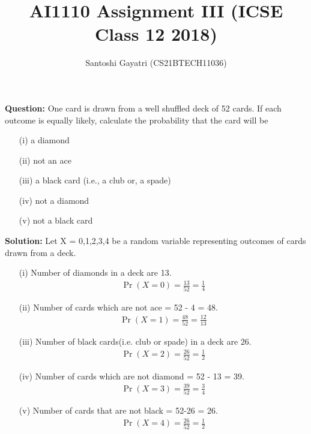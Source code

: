 \documentclass[journal,12pt,twocolumn]{IEEEtran}
\title{AI1110 Assignment III (ICSE Class 12 2018)}
\author{Santoshi Gayatri (CS21BTECH11036)}
\providecommand{\pr}[1]{\ensuremath{\Pr\left(#1\right)}}
\begin{document}
\maketitle

\textbf{Question:} One card is drawn from a well shuffled deck of 52 cards. If each outcome is equally likely, calculate the probability that the card will be
\begin{enumerate}
    \item[(i)]  a diamond
    \item[(ii)] not an ace
    \item[(iii)] a black card (i.e., a club or, a spade)
    \item[(iv)] not a diamond
    \item[(v)] not a black card
\end{enumerate}

\textbf{Solution:}
Let X = {0,1,2,3,4} be a random variable representing outcomes of cards drawn from a deck. 

\begin{table}[ht!]
\centering

\caption{}
\label{table:table1}
\end{table}

\begin{enumerate}
\item[(i)]{Number of diamonds in a deck are 13.\\
\begin{align} 
\pr{X=0} = \frac{13}{52} = \frac{1}{4}
\end{align} }
\item[(ii)]{ Number of cards which are not ace = 52 - 4 = 48.\\
\begin{align}
\pr{X=1} = \frac{48}{52} =\frac{12}{13}
\end{align}}
\item[(iii)] { Number of black cards(i.e. club or spade) in a deck are 26.\\
\begin{align}
\pr{X=2} = \frac{26}{52} = \frac{1}{2}
\end{align} }
\item[(iv)]{Number of cards which are not diamond = 52 - 13 = 39.\\
\begin{align}
\pr{X=3} = \frac{39}{52} = \frac{3}{4}
\end{align}}
\item[(v)]{Number of  cards that are not black = 52-26 = 26.\\
\begin{align}
\pr{X=4} = \frac{26}{52} = \frac{1}{2}
\end{align}}

\end{enumerate}
\end{document}
